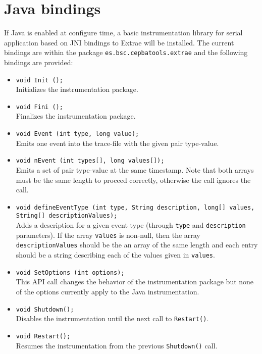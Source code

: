 \section{Java bindings}\label{sec:JavaBindings}

If Java is enabled at configure time, a basic instrumentation library for serial application based on JNI bindings to Extrae will be installed. The current bindings are within the package {\tt es.bsc.cepbatools.extrae} and the following bindings are provided:

\begin{itemize}

  \item \texttt{void Init ();}\\
  Initializes the instrumentation package.

  \item \texttt{void Fini ();}\\
  Finalizes the instrumentation package.

  \item \texttt{void Event (int type, long value);}\\
  Emits one event into the trace-file with the given pair type-value.

  \item \texttt{void nEvent (int types[], long values[]);}\\
  Emits a set of pair type-value at the same timestamp. Note that both arrays must be the same length to proceed correctly, otherwise the call ignores the call.

  \item \texttt{void defineEventType (int type, String description, long[] values, String[] descriptionValues);}\\
  Adds a description for a given event type (through \texttt{type} and \texttt{description} parameters). If the array \texttt{values} is non-null, then the array \texttt{descriptionValues} should be the an array of the same length and each entry should be a string describing each of the values given in \texttt{values}.

  \item \texttt{void SetOptions (int options);}\\
  This API call changes the behavior of the instrumentation package but none of the options currently apply to the Java instrumentation.

  \item \texttt{void Shutdown();}\\
  Disables the instrumentation until the next call to \texttt{Restart()}.

  \item \texttt{void Restart();}\\
  Resumes the instrumentation from the previous \texttt{Shutdown()} call.

\end{itemize}

